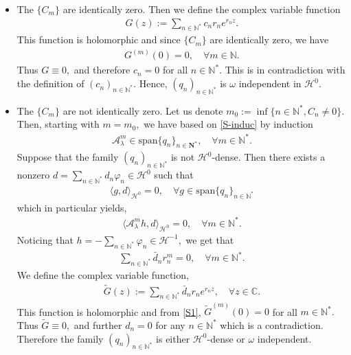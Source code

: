 \documentclass[11pt, dvipsnames]{amsart}
\begin{document}
\begin{itemize}
    \item The $\{C_m\}$ are identically zero.
    Then we define the complex variable function 
    \begin{align*}
        G(z):=\sum_{n\in \mathbb{N}^*}c_nr_ne^{r_n z}.
    \end{align*} This function is holomorphic and since $\{C_m\}$ are identically zero, we have
    \begin{align*}
        G^{(m)}(0)=0, \quad \forall m\in \mathbb{N}. 
    \end{align*} 
    Thus $G\equiv 0,$ and therefore $c_n=0$ for all $n\in \mathbb{N}^*.$ This is in contradiction with the definition of $(c_n)_{n\in \mathbb{N}^*}.$ Hence, $(q_n)_{n\in \mathbb{N}^*}$ is $\omega$ independent in $\mathcal{H}^0.$
    \item The $\{C_m\}$ are not identically zero. Let us denote $m_0:=\inf\{n\in \mathbb{N}^*, C_n\neq 0\}.$ Then, starting with $m=m_0,$ we have based on \eqref{S-induc} by induction 
    \begin{align}
        \mathcal{A}_{\lambda}^m\in \text{span}\{q_n\}_{n\in \mathbf{N}^*},\quad \forall m\in \mathbb{N}^*.
    \end{align}
    Suppose that the family $(q_n)_{n\in \mathbb{N}^*}$ is not 
    ${\mathcal{H}^0}$-dense. Then there exists a nonzero $d=\displaystyle\sum_{n\in \mathbb{N}^*}d_n\varphi_n\in {\mathcal{H}^0}$ such that 
    \begin{align*}
        \langle g,d\rangle_{\mathcal{H}^0}=0, \quad \forall g\in \text{span}\{q_n\}_{n\in \mathbb{N}^*}
    \end{align*} which in particular yields,
    \begin{align*}
        \langle \mathcal{A}_{\lambda}^m h,d\rangle_{\mathcal{H}^0}=0, \quad \forall m\in \mathbb{N}^*.
    \end{align*} 
    Noticing that $h=-\displaystyle\sum_{n\in \mathbb{N}^*}\varphi_n\in \mathcal{H}^{-1},$ we get that 
    \begin{align}
        \sum_{n\in \mathbb{N}^*}\bar d_n r_n^m=0,\quad \forall m\in \mathbb{N}^*.\label{S1}
    \end{align}
    We define the complex variable function,
    \begin{align*}
        \tilde G(z):=\sum_{n\in \mathbb{N}^*}\bar d_nr_ne^{r_n z}, \quad \forall z\in \mathbb{C}.
    \end{align*}
    This function is holomorphic and from \eqref{S1}, $\tilde G^{(m)}(0)=0$ for all $m\in \mathbb{N}^*.$ Thus $\tilde G\equiv 0,$ and further $d_n=0$ for any $n\in \mathbb{N}^*$ which is a contradiction. Therefore the family $(q_n)_{n\in \mathbb{N}^*}$ is either ${\mathcal{H}^0}$-dense or $\omega$ independent.
\end{itemize}
\end{document}
